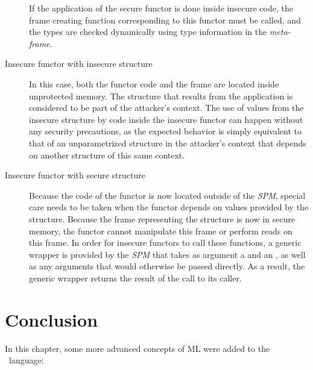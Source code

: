 \begin{description}
If the application of the secure functor is done inside insecure code, the frame creating function corresponding to this functor must be called, and the types are checked dynamically using type information in the \emph{meta-frame}.
\item[Insecure functor with insecure structure]
In this case, both the functor code and the frame are located inside unprotected memory.
The structure that results from the application is considered to be part of the attacker's context.
The use of values from the insecure structure by code inside the insecure functor can happen without any security precautions, as the expected behavior is simply equivalent to that of an unparametrized structure in the attacker's context that depends on another structure of this same context.
\item[Insecure functor with secure structure]
Because the code of the functor is now located outside of the \emph{SPM}, special care needs to be taken when the functor depends on values provided by the structure.
Because the frame  representing the structure is now in secure memory, the functor cannot manipulate this frame or perform reads on this frame.
In order for insecure functors to call these functions, a generic wrapper is provided by the \emph{SPM} that takes as argument a  and an , as well as any arguments that would otherwise be passed directly.
As a result, the generic wrapper returns the result of the call to its caller.
\end{description}


\section{Conclusion}
In this chapter, some more advanced concepts of ML were added to the \MiniML\ language:

